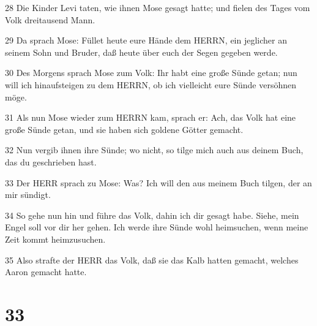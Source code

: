 \par 28 Die Kinder Levi taten, wie ihnen Mose gesagt hatte; und fielen des Tages vom Volk dreitausend Mann.
\par 29 Da sprach Mose: Füllet heute eure Hände dem HERRN, ein jeglicher an seinem Sohn und Bruder, daß heute über euch der Segen gegeben werde.
\par 30 Des Morgens sprach Mose zum Volk: Ihr habt eine große Sünde getan; nun will ich hinaufsteigen zu dem HERRN, ob ich vielleicht eure Sünde versöhnen möge.
\par 31 Als nun Mose wieder zum HERRN kam, sprach er: Ach, das Volk hat eine große Sünde getan, und sie haben sich goldene Götter gemacht.
\par 32 Nun vergib ihnen ihre Sünde; wo nicht, so tilge mich auch aus deinem Buch, das du geschrieben hast.
\par 33 Der HERR sprach zu Mose: Was? Ich will den aus meinem Buch tilgen, der an mir sündigt.
\par 34 So gehe nun hin und führe das Volk, dahin ich dir gesagt habe. Siehe, mein Engel soll vor dir her gehen. Ich werde ihre Sünde wohl heimsuchen, wenn meine Zeit kommt heimzusuchen.
\par 35 Also strafte der HERR das Volk, daß sie das Kalb hatten gemacht, welches Aaron gemacht hatte.

\chapter{33}


